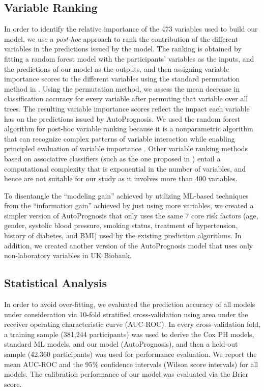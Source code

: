 \documentclass [PhD] {uclathes}
\begin{document}
\subsection*{Variable Ranking}
In order to identify the relative importance of the 473 variables used to build our model, we use a {\it post-hoc} approach to rank the contribution of the different variables in the predictions issued by the model. The ranking is obtained by fitting a random forest model with the participants' variables as the inputs, and the predictions of our model as the outputs, and then assigning variable importance scores to the different variables using the standard permutation method in \cite{strobl2008conditional}. Using the permutation method, we assess the mean decrease in classification accuracy for every variable after permuting that variable over all trees. The resulting variable importance scores reflect the impact each variable has on the predictions issued by AutoPrognosis. We used the random forest algorithm for post-hoc variable ranking because it is a nonparametric algorithm that can recognize complex patterns of variable interaction while enabling principled evaluation of variable importance \cite{strobl2008conditional}. Other variable ranking methods based on associative classifiers (such as the one proposed in \cite{alaa2018autoprognosis}) entail a computational complexity that is exponential in the number of variables, and hence are not suitable for our study as it involves more than 400 variables. 

To disentangle the ``modeling gain'' achieved by utilizing ML-based techniques from the ``information gain'' achieved by just using more variables, we created a simpler version of AutoPrognosis that only uses the same 7 core risk factors (age, gender, systolic blood pressure, smoking status, treatment of hypertension, history of diabetes, and BMI) used by the existing prediction algorithms. In addition, we created another version of the AutoPrognosis model that uses only non-laboratory variables in UK Biobank.

\subsection*{Statistical Analysis}
In order to avoid over-fitting, we evaluated the prediction accuracy of all models under consideration via 10-fold stratified cross-validation using area under the receiver operating characteristic curve (AUC-ROC). In every cross-validation fold, a training sample (381,244 participants) was used to derive the Cox PH models, standard ML models, and our model (AutoPrognosis), and then a held-out sample (42,360 participants) was used for performance evaluation. We report the mean AUC-ROC and the 95$\%$ confidence intervals (Wilson score intervals) for all models. The calibration performance of our model was evaluated via the Brier score. 
\end{document}
